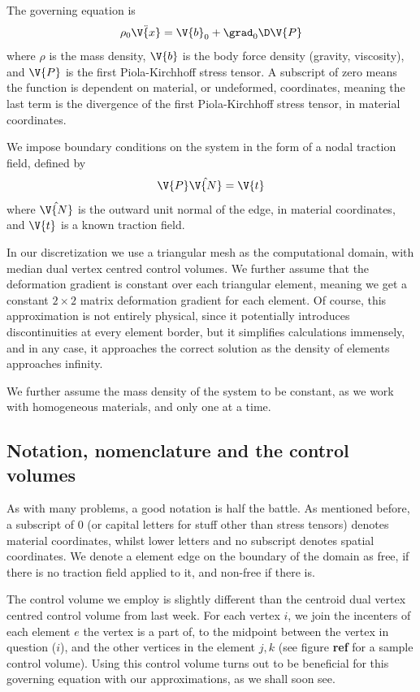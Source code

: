 \documentclass[sigconf]{acmart}
\begin{document}
The governing equation is
\begin{equation}\label{key}
	\rho_0 \ddot{\V{x}} = \V{b}_0 + \grad_{0} \D \V{P}
\end{equation}
where $ \rho $ is the mass density, $ \V{b} $ is the body force density (gravity, viscosity), and $ \V{P} $ is the first Piola-Kirchhoff stress tensor. A subscript of zero means the function is dependent on material, or undeformed, coordinates, meaning the last term is the divergence of the first Piola-Kirchhoff stress tensor, in material coordinates.

We impose boundary conditions on the system in the form of a nodal traction field, defined by
\begin{equation}\label{key}
	\V{P}\hat{\V{N}}=\V{t}
\end{equation}
where $ \hat{\V{N}} $ is the outward unit normal of the edge, in material coordinates, and $ \V{t} $ is a known traction field.

In our discretization we use a triangular mesh as the computational domain, with median dual vertex centred control volumes. We further assume that the deformation gradient is constant over each triangular element, meaning we get a constant $ 2\times 2 $ matrix deformation gradient for each element. Of course, this approximation is not entirely physical, since it potentially introduces discontinuities at every element border, but it simplifies calculations immensely, and in any case, it approaches the correct solution as the density of elements approaches infinity.

We further assume the mass density of the system to be constant, as we work with homogeneous materials, and only one at a time. 

\subsection{Notation, nomenclature and the control volumes}
As with many problems, a good notation is half the battle. As mentioned before, a subscript of 0 (or capital letters for stuff other than stress tensors) denotes material coordinates, whilst lower letters and no subscript denotes spatial coordinates. We denote a element edge on the boundary of the domain as free, if there is no traction field applied to it, and non-free if there is.

The control volume we employ is slightly different than the centroid dual vertex centred control volume from last week. For each vertex $ i $, we join the incenters of each element $ e $ the vertex is a part of, to the midpoint between the vertex in question ($ i $), and the other vertices in the element $ j,k $ (see figure \textbf{ref} for a sample control volume). Using this control volume turns out to be beneficial for this governing equation with our approximations, as we shall soon see.
\end{document}
